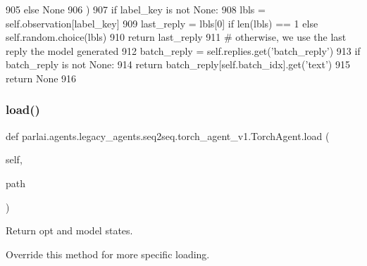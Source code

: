 \begin{DoxyCode}
905                 \textcolor{keywordflow}{else} \textcolor{keywordtype}{None}
906             )
907             \textcolor{keywordflow}{if} label\_key \textcolor{keywordflow}{is} \textcolor{keywordflow}{not} \textcolor{keywordtype}{None}:
908                 lbls = self.observation[label\_key]
909                 last\_reply = lbls[0] \textcolor{keywordflow}{if} len(lbls) == 1 \textcolor{keywordflow}{else} self.random.choice(lbls)
910                 \textcolor{keywordflow}{return} last\_reply
911         \textcolor{comment}{# otherwise, we use the last reply the model generated}
912         batch\_reply = self.replies.get(\textcolor{stringliteral}{'batch\_reply'})
913         \textcolor{keywordflow}{if} batch\_reply \textcolor{keywordflow}{is} \textcolor{keywordflow}{not} \textcolor{keywordtype}{None}:
914             \textcolor{keywordflow}{return} batch\_reply[self.batch\_idx].get(\textcolor{stringliteral}{'text'})
915         \textcolor{keywordflow}{return} \textcolor{keywordtype}{None}
916 
\end{DoxyCode}
\mbox{\label{classparlai_1_1agents_1_1legacy__agents_1_1seq2seq_1_1torch__agent__v1_1_1TorchAgent_a6d71ad7997e048e4f4f7d957fae64ac5}} 
\subsubsection{\texorpdfstring{load()}{load()}}
{\footnotesize\ttfamily def parlai.\+agents.\+legacy\+\_\+agents.\+seq2seq.\+torch\+\_\+agent\+\_\+v1.\+Torch\+Agent.\+load (\begin{DoxyParamCaption}\item[{}]{self,  }\item[{}]{path }\end{DoxyParamCaption})}

\begin{DoxyVerb}Return opt and model states.

Override this method for more specific loading.
\end{DoxyVerb}
 


